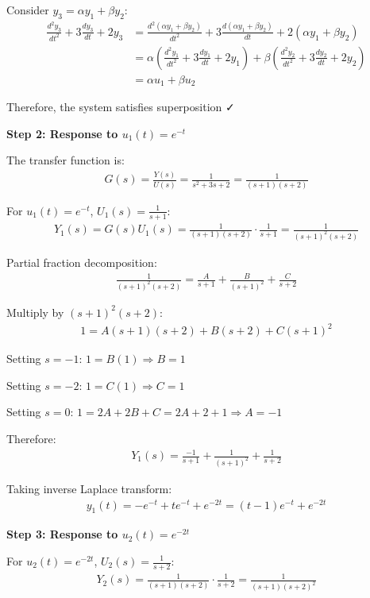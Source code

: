 \documentclass[11pt,a4paper]{article}
\begin{document}
Consider $y_3 = \alpha y_1 + \beta y_2$:
\begin{align}
\frac{d^2y_3}{dt^2} + 3\frac{dy_3}{dt} + 2y_3 &= \frac{d^2(\alpha y_1 + \beta y_2)}{dt^2} + 3\frac{d(\alpha y_1 + \beta y_2)}{dt} + 2(\alpha y_1 + \beta y_2) \\
&= \alpha\left(\frac{d^2y_1}{dt^2} + 3\frac{dy_1}{dt} + 2y_1\right) + \beta\left(\frac{d^2y_2}{dt^2} + 3\frac{dy_2}{dt} + 2y_2\right) \\
&= \alpha u_1 + \beta u_2
\end{align}

Therefore, the system satisfies superposition ✓

\textbf{Step 2: Response to $u_1(t) = e^{-t}$}

The transfer function is:
\begin{align}
G(s) = \frac{Y(s)}{U(s)} = \frac{1}{s^2 + 3s + 2} = \frac{1}{(s+1)(s+2)}
\end{align}

For $u_1(t) = e^{-t}$, $U_1(s) = \frac{1}{s+1}$:
\begin{align}
Y_1(s) = G(s)U_1(s) = \frac{1}{(s+1)(s+2)} \cdot \frac{1}{s+1} = \frac{1}{(s+1)^2(s+2)}
\end{align}

Partial fraction decomposition:
\begin{align}
\frac{1}{(s+1)^2(s+2)} = \frac{A}{s+1} + \frac{B}{(s+1)^2} + \frac{C}{s+2}
\end{align}

Multiply by $(s+1)^2(s+2)$:
\begin{align}
1 = A(s+1)(s+2) + B(s+2) + C(s+1)^2
\end{align}

Setting $s = -1$: $1 = B(1) \Rightarrow B = 1$

Setting $s = -2$: $1 = C(1) \Rightarrow C = 1$

Setting $s = 0$: $1 = 2A + 2B + C = 2A + 2 + 1 \Rightarrow A = -1$

Therefore:
\begin{align}
Y_1(s) = \frac{-1}{s+1} + \frac{1}{(s+1)^2} + \frac{1}{s+2}
\end{align}

Taking inverse Laplace transform:
\begin{align}
y_1(t) = -e^{-t} + te^{-t} + e^{-2t} = (t-1)e^{-t} + e^{-2t}
\end{align}

\textbf{Step 3: Response to $u_2(t) = e^{-2t}$}

For $u_2(t) = e^{-2t}$, $U_2(s) = \frac{1}{s+2}$:
\begin{align}
Y_2(s) = \frac{1}{(s+1)(s+2)} \cdot \frac{1}{s+2} = \frac{1}{(s+1)(s+2)^2}
\end{align}
\end{document}
